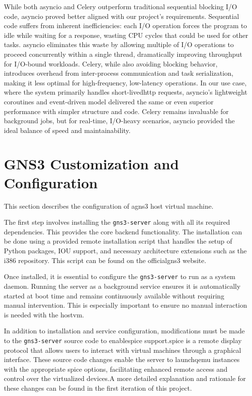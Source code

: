         While both asyncio and Celery outperform traditional sequential blocking I/O code, asyncio proved better 
        aligned with our project's requirements. Sequential code suffers from inherent inefficiencies: each I/O 
        operation forces the program to idle while waiting for a response, wasting CPU cycles that could be used 
        for other tasks. asyncio eliminates this waste by allowing multiple of I/O operations to proceed 
        concurrently within a single thread, dramatically improving throughput for I/O-bound workloads. Celery, 
        while also avoiding blocking behavior, introduces overhead from inter-process communication and task 
        serialization, making it less optimal for high-frequency, low-latency operations. In our use case, where the 
        system primarily handles short-lived\ac{http} requests, asyncio's lightweight coroutines and event-driven model 
        delivered the same or even superior performance with simpler structure and code. Celery remains invaluable for 
        background jobs, but for real-time, I/O-heavy scenarios, asyncio provided the ideal balance of speed and 
        maintainability.

\section{GNS3 Customization and Configuration}
    This section describes the configuration of a\ac{gns3} host virtual machine. 

    The first step involves installing the \texttt{gns3-server} along with all its required dependencies. This provides the 
    core backend functionality. The installation can be done using a provided remote installation script that handles the 
    setup of Python packages, IOU support, and necessary architecture extensions such as the i386 repository. 
    This script can be found on the official\ac{gns3} website.

    Once installed, it is essential to configure the \texttt{gns3-server} to run as a system daemon. Running the server as 
    a background service ensures it is automatically started at boot time and remains continuously available without 
    requiring manual intervention. This is especially important to ensure no manual interaction is needed with the host\ac{vm}.

    In addition to installation and service configuration, modifications must be made to the \texttt{gns3-server} source 
    code to enable\ac{spice} support.\ac{spice} is a remote display protocol that allows users to interact with virtual machines 
    through a graphical interface. These source code changes enable the server to launch\ac{qemu} instances with the appropriate
    \ac{spice} options, facilitating enhanced remote access and control over the virtualized devices.A more detailed explanation 
    and rationale for these changes can be found in the first iteration of this project\cite{santos2024}.

